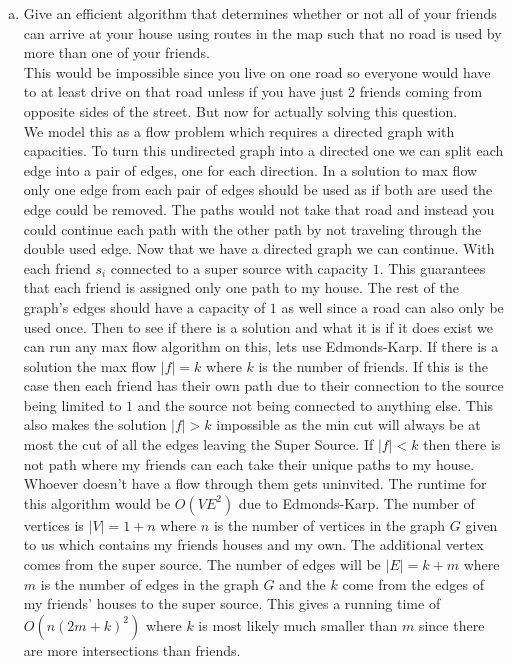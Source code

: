 \documentclass{article}
\begin{document}
\begin{enumerate}[a.]
\item Give an efficient algorithm that determines whether or not all of your friends can arrive at your house using routes in the map such that no road is used by more than one of your friends.\\
\newline
This would be impossible since you live on one road so everyone would have to at least drive on that road unless if you have just 2 friends coming from opposite sides of the street.
But now for actually solving this question.\\
\indent We model this as a flow problem which requires a directed graph with capacities.
To turn this undirected graph into a directed one we can split each edge into a pair of edges, one for each direction.
In a solution to max flow only one edge from each pair of edges should be used as if both are used the edge could be removed.
The paths would not take that road and instead you could continue each path with the other path by not traveling through the double used edge.
\newline Now that we have a directed graph we can continue.
With each friend $s_i$ connected to a super source with capacity $1$.
This guarantees that each friend is assigned only one path to my house.
The rest of the graph's edges should have a capacity of $1$ as well since a road can also only be used once.
Then to see if there is a solution and what it is if it does exist we can run any max flow algorithm on this, lets use Edmonds-Karp.
If there is a solution the max flow $|f| = k$ where $k$ is the number of friends.
If this is the case then each friend has their own path due to their connection to the source being limited to $1$ and the source not being connected to anything else.
This also makes the solution $|f| > k$ impossible as the min cut will always be at most the cut of all the edges leaving the Super Source.
If $|f| < k$ then there is not path where my friends can each take their unique paths to my house.
Whoever doesn't have a flow through them gets uninvited.
The runtime for this algorithm would be $O(VE^2)$ due to Edmonds-Karp.
The number of vertices is $|V| = 1 + n$ where $n$ is the number of vertices in the graph $G$ given to us which contains my friends houses and my own.
The additional vertex comes from the super source.
The number of edges will be $|E| = k + m $ where $m$ is the number of edges in the graph $G$ and the $k$ come from the edges of my friends' houses to the super source.
This gives a running time of $O(n(2m+k)^2)$ where $k$ is most likely much smaller than $m$ since there are more intersections than friends.


\end{enumerate}
\end{document}
